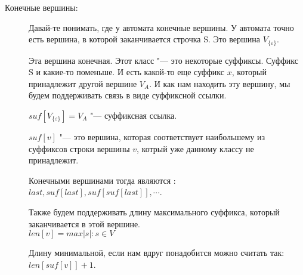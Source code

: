 \begin{description}
    \item[Конечные вершины:]
    Давай-те понимать, где у автомата конечные вершины. У автомата точно есть 
    вершина, в которой заканчивается строчка S. Это вершина $V_{\{\varepsilon\}}$.

    Эта вершина конечная. Этот класс "--- это некоторые суффиксы. Суффикс S и какие-то поменьше.
    И есть какой-то еще суффикс $x$, который принадлежит другой вершине $V_A$. И как 
    нам находить эту вершину, мы будем поддерживать связь в виде суффиксной ссылки. 

    \begin{Def}
    $suf[V_{\{\varepsilon\}}] = V_A$ "--- суффиксная ссылка. 

    $suf[v]$ "--- это вершина, которая соответствует наибольшему из суффиксов строки вершины $v$, котрый 
    уже данному классу не принадлежит.
    \end{Def}

    Конечными вершинами тогда являются : $last, suf[last], suf[suf[last]], \cdots$.

    \begin{Def}
     Также будем поддерживать длину максимального суффикса, который заканчивается в этой вершине.\\
     $len[v] = max|s| \colon s \in V$
    \end{Def}
    
    Длину минимальной, если нам вдруг понадобится можно считать так: $len[suf[v]] + 1$.
    \end{description}
